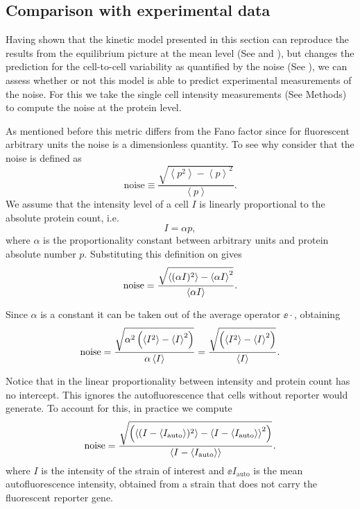 \subsection{Comparison with experimental data}\label{supp_theory_vs_data_mom}

Having shown that the kinetic model presented in this section can reproduce the
results from the equilibrium picture at the mean level (See
 and ), but changes the
prediction for the cell-to-cell variability as quantified by the noise
(See ), we can assess whether or not this model is
able to predict experimental measurements of the noise. For this we take the
single cell intensity measurements (See Methods) to compute the noise at the
protein level.

As mentioned before this metric differs from the Fano factor since for
fluorescent arbitrary units the noise is a dimensionless quantity. To see why
consider that the noise is defined as
\begin{equation}
\text{noise} \equiv \frac{\sqrt{\left\langle p^2 \right\rangle -
                        \left\langle p \right\rangle^2}}
                        {\left\langle p \right\rangle}.
    \label{seq_noise_protein}
\end{equation}
We assume that the intensity level of a cell $I$ is linearly proportional to
the absolute protein count, i.e.
\begin{equation}
I = \alpha p,
\label{seq_calibration_factor}
\end{equation}
where $\alpha$ is the proportionality constant between arbitrary units and
protein absolute number $p$. Substituting this definition on
 gives
\begin{equation}
  \text{noise} = {\sqrt{\left\langle (\alpha I)^2 \right\rangle - \left\langle \alpha I \right\rangle^2} \over
                \left\langle \alpha I \right\rangle}.
\end{equation}

Since $\alpha$ is a constant it can be taken out of the average operator
$\ee{\cdot}$, obtaining
\begin{equation}
  \text{noise} = {\sqrt{\alpha^2 \left(\left\langle I^2 \right\rangle -
                \left\langle I \right\rangle^2 \right)} \over
                \alpha \left\langle I \right\rangle}
       = {\sqrt{\left(\left\langle I^2 \right\rangle - \left\langle I \right\rangle^2 \right)} \over
                \left\langle I \right\rangle}.
\end{equation}

Notice that in  the linear proportionality between
intensity and protein count has no intercept. This ignores the autofluorescence
that cells without reporter would generate. To account for this, in practice we
compute
\begin{equation}
\text{noise} = {\sqrt{\left(\left\langle (I - \left\langle I_\text{auto} \right\rangle)^2 \right\rangle -
                    \left\langle I - \left\langle I_\text{auto} \right\rangle \right\rangle^2 \right)} \over
                \left\langle I - \left\langle I_\text{auto} \right\rangle \right\rangle}.
\end{equation}
where $I$ is the intensity of the strain of interest and $\ee{I_\text{auto}}$ is
the mean autofluorescence intensity, obtained from a strain that does not carry
the fluorescent reporter gene.

